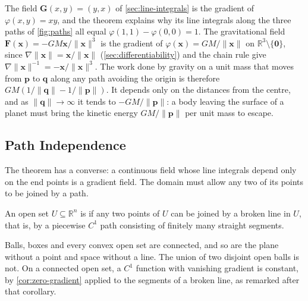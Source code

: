 The field $\mathbf G(x,y)=(y,x)$ of \cref{sec:line-integrals} is the gradient of $\varphi(x,y)=xy$, and the theorem explains why its line integrals along the three paths of \cref{fig:paths} all equal $\varphi(1,1)-\varphi(0,0)=1$. The gravitational field $\mathbf F(\mathbf x)=-GM\mathbf x/\|\mathbf x\|^3$ is the gradient of $\varphi(\mathbf x)=GM/\|\mathbf x\|$ on $\mathbb R^3\setminus\{\mathbf0\}$, since $\nabla\|\mathbf x\|=\mathbf x/\|\mathbf x\|$ (\cref{sec:differentiability}) and the chain rule give $\nabla\|\mathbf x\|^{-1}=-\mathbf x/\|\mathbf x\|^3$. The work done by gravity on a unit mass that moves from $\mathbf p$ to $\mathbf q$ along any path avoiding the origin is therefore $GM(1/\|\mathbf q\|-1/\|\mathbf p\|)$. It depends only on the distances from the centre, and as $\|\mathbf q\|\to\infty$ it tends to $-GM/\|\mathbf p\|$: a body leaving the surface of a planet must bring the kinetic energy $GM/\|\mathbf p\|$ per unit mass to escape.

\subsection{Path Independence}

The theorem has a converse: a continuous field whose line integrals depend only on the end points is a gradient field. The domain must allow any two of its points to be joined by a path.

\begin{definition}
\label{def:connected-open}
An open set $U\subseteq\mathbb R^n$ is  if any two points of $U$ can be joined by a broken line in $U$, that is, by a piecewise $C^1$ path consisting of finitely many straight segments.
\end{definition}

Balls, boxes and every convex open set are connected, and so are the plane without a point and space without a line. The union of two disjoint open balls is not. On a connected open set, a $C^1$ function with vanishing gradient is constant, by \cref{cor:zero-gradient} applied to the segments of a broken line, as remarked after that corollary.

